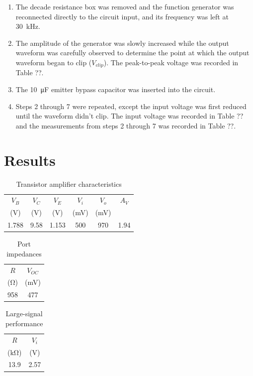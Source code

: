 \begin{enumerate}
\item The decade resistance box was removed and the function generator was reconnected directly to the circuit input, and its frequency was left at \SI{30}{\kilo\hertz}.
\item The amplitude of the generator was slowly increased while the output waveform was carefully observed to determine the point at which the output waveform began to clip ($V_{clip}$). The peak-to-peak voltage was recorded in Table ??.
\item The \SI{10}{\micro\farad} emitter bypass capacitor was inserted into the circuit.
\item Steps 2 through 7 were repeated, except the input voltage was first reduced until the waveform didn’t clip. The input voltage was recorded in Table ?? and the measurements from steps 2 through 7 was recorded in Table ??.
\end{enumerate}
\section{Results}

\begin{table}[hbtp]
  \centering
  \begin{tabular}{ccc|cc|c}
    $V_B$    & $V_C$    & $V_E$    & $V_i$     & $V_o$     & $A_V$ \\
    (\si{V}) & (\si{V}) & (\si{V}) & (\si{mV}) & (\si{mV}) &       \\
    \hline
    1.788    & 9.58     & 1.153    & 500       & 970       & 1.94  \\
  \end{tabular}
  \caption{\label{tab:amp} Transistor amplifier characteristics}
\end{table}

\begin{table}[hbtp]
  \centering
  \begin{tabular}{cc}
    $R$         & $V_{OC}$  \\
    (\si{\ohm}) & (\si{mV}) \\
    \hline
    958         & 477       \\
  \end{tabular}
  \caption{\label{tab:imp} Port impedances}
\end{table}

\begin{table}[hbtp]
  \centering
  \begin{tabular}{cc}
    $R$              & $V_i$    \\
    (\si{\kilo\ohm}) & (\si{V}) \\
    \hline
    13.9             & 2.57     \\
  \end{tabular}
  \caption{\label{tab:lrg_sig} Large-signal performance}
\end{table}

